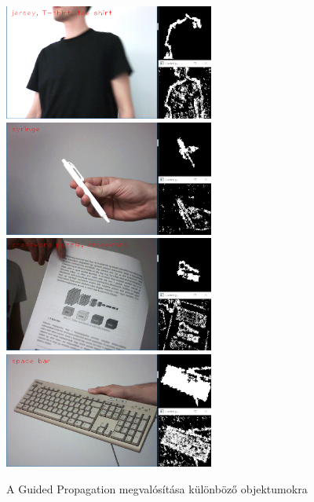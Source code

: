 \begin{figure}[!h]
	\centering
	\includegraphics[width=69mm, keepaspectratio]{figures/m07/Untitled-.jpg}\hspace{5mm}
	\includegraphics[width=69mm, keepaspectratio]{figures/m07/Untitled-2.jpg}\\\vspace{5mm}
	\includegraphics[width=69mm, keepaspectratio]{figures/m07/Untitled-3.jpg}\hspace{5mm}
	\includegraphics[width=69mm, keepaspectratio]{figures/m07/Untitled-4.jpg}
	\caption{A Guided Propagation megvalósítása különböző objektumokra}
	\label{fig:poi}
\end{figure}





































